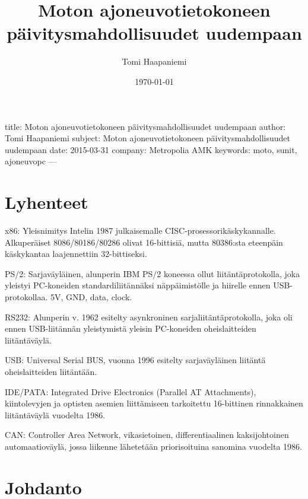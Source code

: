 \documentclass[]{article}
\date{}
\begin{document}
\section{}\label{section}

title: Moton ajoneuvotietokoneen päivitysmahdollisuudet uudempaan
author: Tomi Haapaniemi subject: Moton ajoneuvotietokoneen
päivitysmahdollisuudet uudempaan date: 2015-03-31 company: Metropolia
AMK keywords: moto, sunit, ajoneuvopc ---

\title{Moton ajoneuvotietokoneen päivitysmahdollisuudet uudempaan}\date{\today}\author{Tomi Haapaniemi}

\maketitle

\newpage

\section{Lyhenteet}\label{lyhenteet}

x86: Yleisnimitys Intelin 1987 julkaisemalle
CISC-prosessorikäskykannalle. Alkuperäiset 8086/80186/80286 olivat
16-bittisiä, mutta 80386:sta eteenpäin käskykantaa laajennettiin
32-bittiseksi.

PS/2: Sarjaväyläinen, alunperin IBM PS/2 koneessa ollut
liitäntäprotokolla, joka yleistyi PC-koneiden standardiliitännäksi
näppäimistölle ja hiirelle ennen USB-protokollaa. 5V, GND, data, clock.

RS232: Alunperin v. 1962 esitelty asynkroninen sarjaliitäntäprotokolla,
joka oli ennen USB-liitännän yleistymistä yleisin PC-koneiden
oheislaitteiden liitäntäväylä.

USB: Universal Serial BUS, vuonna 1996 esitelty sarjaväyläinen liitäntä
oheislaitteiden liitäntään.

IDE/PATA: Integrated Drive Electronics (Parallel AT Attachments),
kiintolevyjen ja optisten asemien liittämiseen tarkoitettu 16-bittinen
rinnakkainen liitäntäväylä vuodelta 1986.

CAN: Controller Area Network, vikasietoinen, differentiaalinen
kaksijohtoinen automaatioväylä, jossa liikenne lähetetään priorisoituina
sanomina vuodelta 1986.

\section{Johdanto}\label{johdanto}
\end{document}
